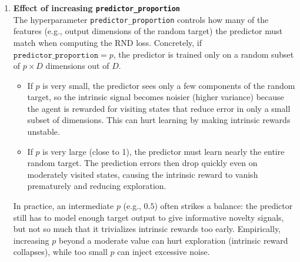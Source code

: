 \documentclass[12pt]{article}
\begin{document}
{{{\begin{itemize}[noitemsep]
\begin{enumerate}
  \item \textbf{Effect of increasing \texttt{predictor\_proportion}}\\
    The hyperparameter \texttt{predictor\_proportion} controls how many of the features (e.g., output dimensions of the random target) the predictor must match when computing the RND loss. Concretely, if \(\texttt{predictor\_proportion} = p\), the predictor is trained only on a random subset of \(p \times D\) dimensions out of \(D\).  
    \begin{itemize}
      \item If \(p\) is very small, the predictor sees only a few components of the random target, so the intrinsic signal becomes noisier (higher variance) because the agent is rewarded for visiting states that reduce error in only a small subset of dimensions. This can hurt learning by making intrinsic rewards unstable.
      \item If \(p\) is very large (close to 1), the predictor must learn nearly the entire random target. The prediction errors then drop quickly even on moderately visited states, causing the intrinsic reward to vanish prematurely and reducing exploration.
    \end{itemize}
    In practice, an intermediate \(p\) (e.g., \(0.5\)) often strikes a balance: the predictor still has to model enough target output to give informative novelty signals, but not so much that it trivializes intrinsic rewards too early. Empirically, increasing \(p\) beyond a moderate value can hurt exploration (intrinsic reward collapses), while too small \(p\) can inject excessive noise.\\


\end{enumerate}
\end{itemize}}}}
\end{document}
